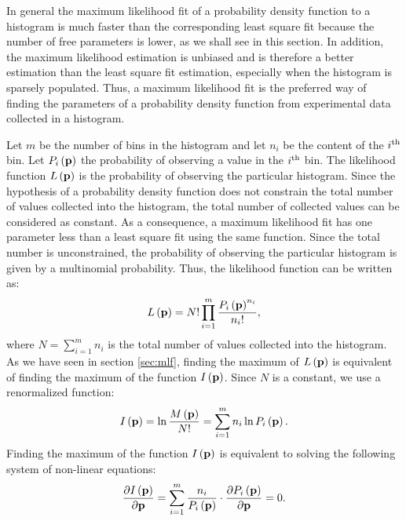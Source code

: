 \documentclass[twoside]{book}
\begin{document}
In general the maximum likelihood fit of a probability density
function to a histogram is much faster than the corresponding
least square fit because the number of free parameters is lower,
as we shall see in this section. In addition, the maximum
likelihood estimation is unbiased and is therefore a better
estimation than the least square fit estimation, especially when
the histogram is sparsely populated. Thus, a maximum likelihood
fit is the preferred way of finding the parameters of a
probability density function from experimental data collected in a
histogram.

Let $m$ be the number of bins in the histogram and let $n_i$ be
the content of the $i^{\mathop{\rm th}}$ bin. Let $P_i\left({\bf
p}\right)$ the probability of observing a value in the
$i^{\mathop{\rm th}}$ bin. The likelihood function $L\left({\bf
p}\right)$ is the probability of observing the particular
histogram. Since the hypothesis of a probability density function
does not constrain the total number of values collected into the
histogram, the total number of collected values can be considered
as constant. As a consequence, a maximum likelihood fit has one
parameter less than a least square fit using the same function.
Since the total number is unconstrained, the probability of
observing the particular histogram is given by a multinomial
probability. Thus, the likelihood function can be written as:
\begin{equation}
\label{eq:mlfhist}
  L\left({\bf p}\right)=N!\prod_{i=1}^m{\displaystyle P_i\left({\bf
  p}\right)^{n_i}\over\displaystyle n_i!},
\end{equation}
where $N=\sum_{i=1}^m n_i$ is the total number of values collected
into the histogram. As we have seen in section \ref{sec:mlf},
finding the maximum of $L\left({\bf p}\right)$ is equivalent of
finding the maximum of the function $I\left({\bf p}\right)$. Since
$N$ is a constant, we use a renormalized function:
\begin{equation}
\label{eq:mlogfhist} I\left({\bf p}\right)=\ln {\displaystyle
M\left({\bf p}\right) \over\displaystyle N!}=\sum_{i=1}^m n_i \ln
P_i\left({\bf p}\right).
\end{equation}
Finding the maximum of the function $I\left({\bf p}\right)$ is
equivalent to solving the following system of non-linear
equations:
\begin{equation}
\label{eq:mlfsys} {\displaystyle\partial I\left({\bf p}\right)
\over\displaystyle\partial{\bf p}}=\sum_{i=1}^m {\displaystyle n_i
\over\displaystyle P_i\left({\bf
p}\right)}\cdot{\displaystyle\partial P_i\left({\bf p}\right)
\over\displaystyle\partial{\bf p}}=0.
\end{equation}
\end{document}
